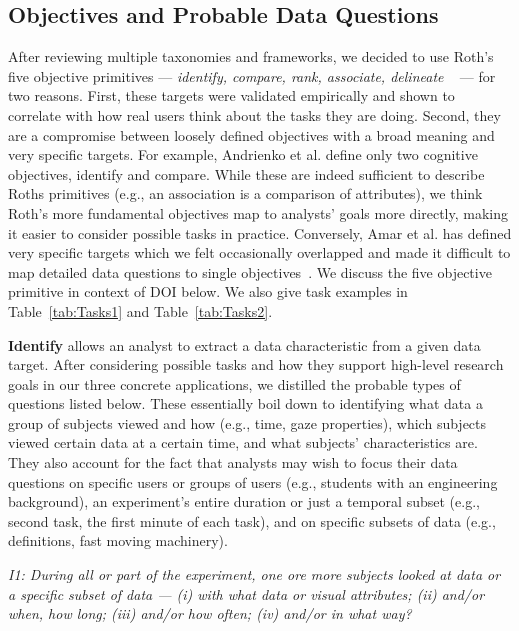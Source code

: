 \subsection{Objectives and Probable Data Questions}
After reviewing multiple taxonomies and frameworks, we decided to use Roth's five objective primitives --- \textit{identify, compare, rank, associate, delineate} ~\cite{Roth13}  --- for two reasons. First, these targets were validated empirically and shown to correlate with how real users think about the tasks they are doing. Second, they are a compromise between loosely defined objectives with a broad meaning and very specific targets. For example, Andrienko et al. define only two cognitive objectives, identify and compare. While these are indeed sufficient to describe Roths primitives (e.g., an association is a comparison of attributes), we think Roth's more fundamental objectives map to analysts' goals more directly, making it easier to consider possible tasks in practice. Conversely, Amar et al. has defined very specific targets which we felt occasionally overlapped and made it difficult to map detailed data questions to single objectives~\cite{Ama05}. We discuss the five objective primitive in context of DOI below. We also give task examples in Table~\ref{tab:Tasks1} and Table~\ref{tab:Tasks2}.

\vspace{2mm}

\noindent\textbf{Identify} allows an analyst to extract a data characteristic from a given data target. After considering possible tasks and how they support high-level research goals in our three concrete applications, we distilled the probable types of questions listed below. These essentially boil down to identifying what data a group of subjects viewed and how (e.g., time, gaze properties), which subjects viewed certain data at a certain time, and what subjects' characteristics are. They also account for the fact that analysts may wish to focus their data questions on specific users or groups of users (e.g., students with an engineering background), an experiment's entire duration or just a temporal subset (e.g., second task, the first minute of each task), and on specific subsets of data (e.g., definitions, fast moving machinery). 

\vspace{2mm}
\hangindent=3mm\textit{I1: During all or part of the experiment, one ore more subjects looked at data or a specific subset of data --- (i) with what data or visual attributes; (ii) and/or when, how long; (iii) and/or how often; (iv) and/or in what way?}

